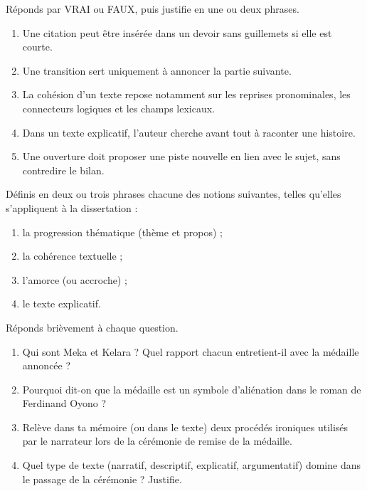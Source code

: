 \documentclass[11pt]{article}
\newcommand{\cle}[1]{{\popxbold\color{popdark}#1}}
\begin{document}
\begin{exercice}
Réponds par VRAI ou FAUX, puis justifie en une ou deux phrases.
\begin{enumerate}
\item Une citation peut être insérée dans un devoir sans guillemets si elle est courte.
\item Une transition sert uniquement à annoncer la partie suivante.
\item La cohésion d'un texte repose notamment sur les reprises pronominales, les connecteurs logiques et les champs lexicaux.
\item Dans un texte explicatif, l'auteur cherche avant tout à raconter une histoire.
\item Une ouverture doit proposer une piste nouvelle en lien avec le sujet, sans contredire le bilan.
\end{enumerate}
\end{exercice}

\begin{exercice}[Définitions]
Définis en deux ou trois phrases chacune des notions suivantes, telles qu'elles s'appliquent à la dissertation :
\begin{enumerate}
\item la \cle{progression thématique} (thème et propos) ;
\item la \cle{cohérence} textuelle ;
\item l'\cle{amorce} (ou accroche) ;
\item le \cle{texte explicatif}.
\end{enumerate}
\end{exercice}

\begin{exercice}
Réponds brièvement à chaque question.
\begin{enumerate}
\item Qui sont Meka et Kelara ? Quel rapport chacun entretient-il avec la médaille annoncée ?
\item Pourquoi dit-on que la médaille est un symbole d'aliénation dans le roman de Ferdinand Oyono ?
\item Relève dans ta mémoire (ou dans le texte) deux procédés ironiques utilisés par le narrateur lors de la cérémonie de remise de la médaille.
\item Quel type de texte (narratif, descriptif, explicatif, argumentatif) domine dans le passage de la cérémonie ? Justifie.
\end{enumerate}
\end{exercice}
\end{document}
